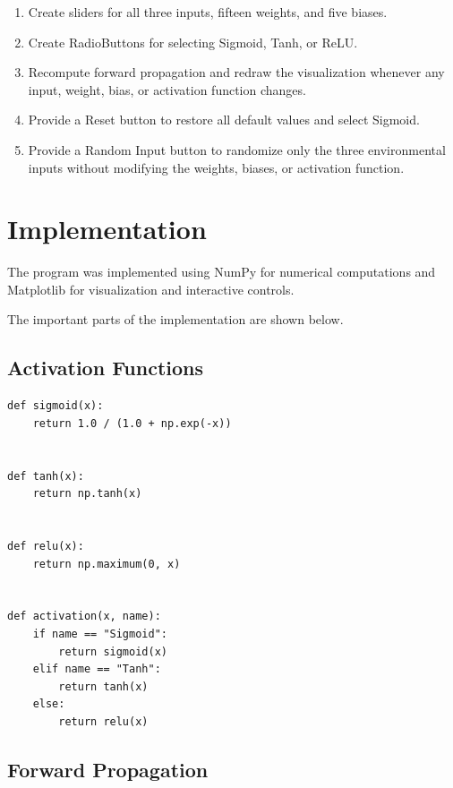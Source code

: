 \documentclass[12pt]{article}
\begin{document}
\begin{enumerate}
    \item Create sliders for all three inputs, fifteen weights, and
    five biases.

    \item Create RadioButtons for selecting Sigmoid, Tanh, or ReLU.

    \item Recompute forward propagation and redraw the visualization
    whenever any input, weight, bias, or activation function changes.

    \item Provide a Reset button to restore all default values and
    select Sigmoid.

    \item Provide a Random Input button to randomize only the three
    environmental inputs without modifying the weights, biases, or
    activation function.

\end{enumerate}


\section{Implementation}

The program was implemented using NumPy for numerical computations and
Matplotlib for visualization and interactive controls.

The important parts of the implementation are shown below.

\subsection{Activation Functions}

\begin{lstlisting}
def sigmoid(x):
    return 1.0 / (1.0 + np.exp(-x))


def tanh(x):
    return np.tanh(x)


def relu(x):
    return np.maximum(0, x)


def activation(x, name):
    if name == "Sigmoid":
        return sigmoid(x)
    elif name == "Tanh":
        return tanh(x)
    else:
        return relu(x)
\end{lstlisting}

\subsection{Forward Propagation}
\end{document}
